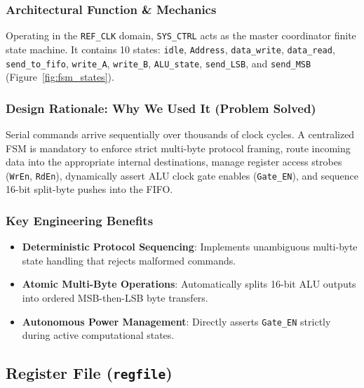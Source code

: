\documentclass[11pt,a4paper]{article}
\begin{document}
\subsubsection{Architectural Function \& Mechanics}
Operating in the \texttt{REF\_CLK} domain, \texttt{SYS\_CTRL} acts as the master coordinator finite state machine. It contains 10 states: \texttt{idle}, \texttt{Address}, \texttt{data\_write}, \texttt{data\_read}, \texttt{send\_to\_fifo}, \texttt{write\_A}, \texttt{write\_B}, \texttt{ALU\_state}, \texttt{send\_LSB}, and \texttt{send\_MSB} (Figure~\ref{fig:fsm_states}).

\subsubsection{Design Rationale: Why We Used It (Problem Solved)}
Serial commands arrive sequentially over thousands of clock cycles. A centralized FSM is mandatory to enforce strict multi-byte protocol framing, route incoming data into the appropriate internal destinations, manage register access strobes (\texttt{WrEn}, \texttt{RdEn}), dynamically assert ALU clock gate enables (\texttt{Gate\_EN}), and sequence 16-bit split-byte pushes into the FIFO.

\subsubsection{Key Engineering Benefits}
\begin{itemize}
    \item \textbf{Deterministic Protocol Sequencing}: Implements unambiguous multi-byte state handling that rejects malformed commands.
    \item \textbf{Atomic Multi-Byte Operations}: Automatically splits 16-bit ALU outputs into ordered MSB-then-LSB byte transfers.
    \item \textbf{Autonomous Power Management}: Directly asserts \texttt{Gate\_EN} strictly during active computational states.
\end{itemize}

\subsection{Register File (\texttt{regfile})}
\end{document}
